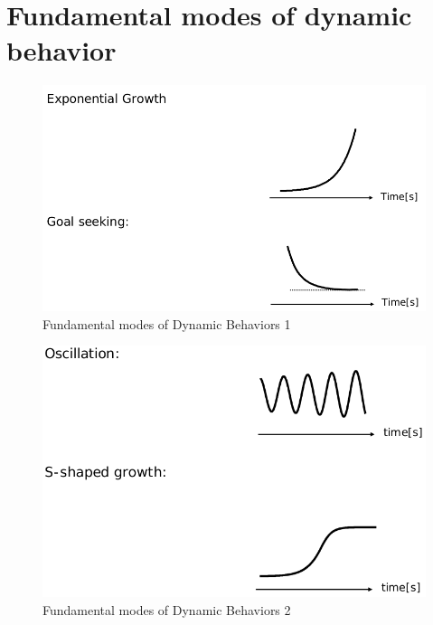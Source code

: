 \hypertarget{fundamental-modes-of-dynamic-behavior}{%
\section{Fundamental modes of dynamic
behavior}\label{fundamental-modes-of-dynamic-behavior}}

\begin{figure}
\centering
\includegraphics{figures/fundamentalModesDynamicBehavior1.png}
\caption{Fundamental modes of Dynamic Behaviors 1}
\end{figure}

\begin{figure}
\centering
\includegraphics{figures/fundamentalModesDynamicBehavior2.png}
\caption{Fundamental modes of Dynamic Behaviors 2}
\end{figure}

